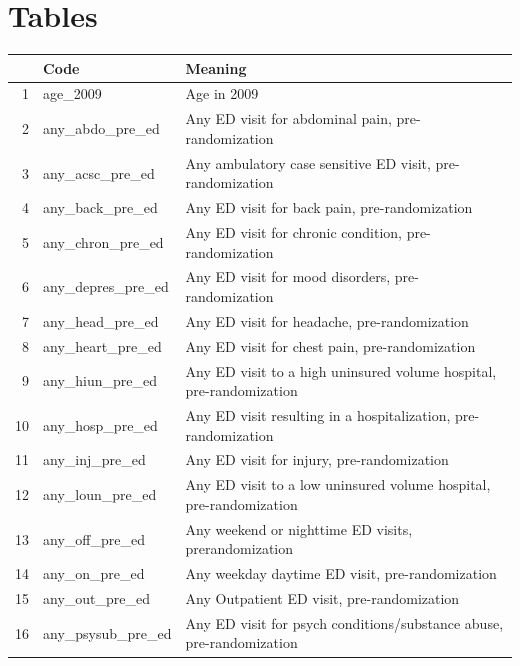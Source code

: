 \appendix

\newpage
% 

\printbibliography

\newpage
\section{Tables}

\begin{table}[ht]
  {
    \tiny
    \centering
  \begin{tabular}{rll}
    \hline
   & Code & Meaning \\ 
    \hline
  1 & age\_2009 & Age in 2009 \\ 
    2 & any\_abdo\_pre\_ed & Any ED visit for abdominal pain, pre-randomization \\ 
    3 & any\_acsc\_pre\_ed & Any ambulatory case sensitive ED visit, pre-randomization \\ 
    4 & any\_back\_pre\_ed & Any ED visit for back pain, pre-randomization \\ 
    5 & any\_chron\_pre\_ed & Any ED visit for chronic condition, pre-randomization \\ 
    6 & any\_depres\_pre\_ed & Any ED visit for mood disorders, pre-randomization \\ 
    7 & any\_head\_pre\_ed & Any ED visit for headache, pre-randomization \\ 
    8 & any\_heart\_pre\_ed & Any ED visit for chest pain, pre-randomization \\ 
    9 & any\_hiun\_pre\_ed & Any ED visit to a high uninsured volume hospital, pre-randomization \\ 
    10 & any\_hosp\_pre\_ed & Any ED visit resulting in a hospitalization, pre-randomization \\ 
    11 & any\_inj\_pre\_ed & Any ED visit for injury, pre-randomization \\ 
    12 & any\_loun\_pre\_ed & Any ED visit to a low uninsured volume hospital, pre-randomization \\ 
    13 & any\_off\_pre\_ed & Any weekend or nighttime ED visits, prerandomization \\ 
    14 & any\_on\_pre\_ed & Any weekday daytime ED visit, pre-randomization \\ 
    15 & any\_out\_pre\_ed & Any Outpatient ED visit, pre-randomization \\ 
    16 & any\_psysub\_pre\_ed & Any ED visit for psych conditions/substance abuse, pre-randomization \\ 

\end{tabular}}
\end{table}
